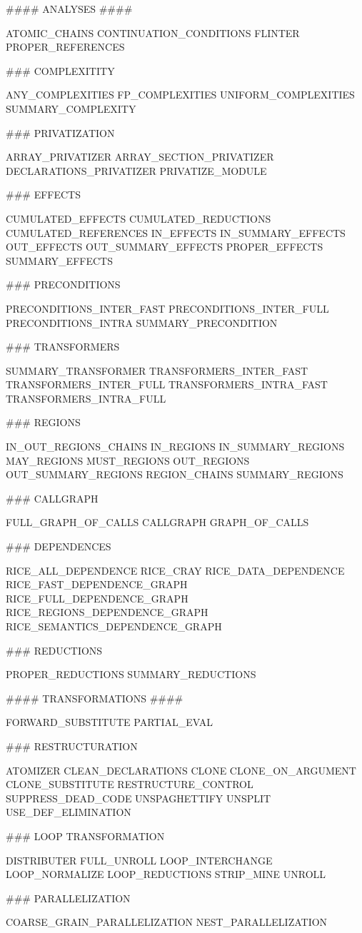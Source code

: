 \documentclass[a4paper]{article}
\begin{document}
\begin{verbatim*}
#### ANALYSES ####

ATOMIC_CHAINS                    
CONTINUATION_CONDITIONS  
FLINTER  
PROPER_REFERENCES

### COMPLEXITITY 

ANY_COMPLEXITIES  
FP_COMPLEXITIES  
UNIFORM_COMPLEXITIES
SUMMARY_COMPLEXITY

### PRIVATIZATION

ARRAY_PRIVATIZER  
ARRAY_SECTION_PRIVATIZER  
DECLARATIONS_PRIVATIZER 
PRIVATIZE_MODULE

### EFFECTS

CUMULATED_EFFECTS  
CUMULATED_REDUCTIONS  
CUMULATED_REFERENCES  
IN_EFFECTS 
IN_SUMMARY_EFFECTS 
OUT_EFFECTS  
OUT_SUMMARY_EFFECTS  
PROPER_EFFECTS
SUMMARY_EFFECTS


### PRECONDITIONS

PRECONDITIONS_INTER_FAST  
PRECONDITIONS_INTER_FULL  
PRECONDITIONS_INTRA  
SUMMARY_PRECONDITION


### TRANSFORMERS

SUMMARY_TRANSFORMER
TRANSFORMERS_INTER_FAST
TRANSFORMERS_INTER_FULL
TRANSFORMERS_INTRA_FAST
TRANSFORMERS_INTRA_FULL


### REGIONS 

IN_OUT_REGIONS_CHAINS  
IN_REGIONS 
IN_SUMMARY_REGIONS 
MAY_REGIONS 
MUST_REGIONS
OUT_REGIONS  
OUT_SUMMARY_REGIONS  
REGION_CHAINS
SUMMARY_REGIONS

### CALLGRAPH 

FULL_GRAPH_OF_CALLS  
CALLGRAPH  
GRAPH_OF_CALLS 

### DEPENDENCES

RICE_ALL_DEPENDENCE
RICE_CRAY
RICE_DATA_DEPENDENCE
RICE_FAST_DEPENDENCE_GRAPH
RICE_FULL_DEPENDENCE_GRAPH
RICE_REGIONS_DEPENDENCE_GRAPH
RICE_SEMANTICS_DEPENDENCE_GRAPH

### REDUCTIONS

PROPER_REDUCTIONS
SUMMARY_REDUCTIONS


#### TRANSFORMATIONS #### 

FORWARD_SUBSTITUTE            
PARTIAL_EVAL 

### RESTRUCTURATION 

ATOMIZER  
CLEAN_DECLARATIONS  
CLONE  
CLONE_ON_ARGUMENT  
CLONE_SUBSTITUTE  
RESTRUCTURE_CONTROL
SUPPRESS_DEAD_CODE
UNSPAGHETTIFY
UNSPLIT
USE_DEF_ELIMINATION

### LOOP TRANSFORMATION

DISTRIBUTER  
FULL_UNROLL 
LOOP_INTERCHANGE  
LOOP_NORMALIZE  
LOOP_REDUCTIONS  
STRIP_MINE
UNROLL

### PARALLELIZATION

COARSE_GRAIN_PARALLELIZATION  
NEST_PARALLELIZATION 
\end{verbatim*}
\end{document}
